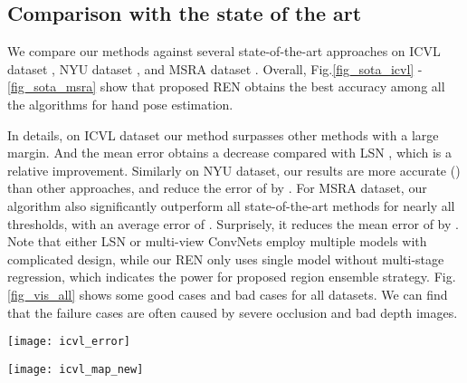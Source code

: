 \documentclass[10pt,twocolumn,letterpaper]{article}
\begin{document}
\subsection{Comparison with the state of the art}
We compare our methods against several state-of-the-art approaches on ICVL dataset \cite{tang2014latent} \cite{oberweger2015hands} \cite{sun2015cascaded} \cite{zhou2016model} \cite{wan2016hand} \cite{wan2017cross}, NYU dataset \cite{tompson2014real} \cite{oberweger2015hands} \cite{oberwegertraining} \cite{sinha2016deephand} \cite{gerobust} \cite{zhou2016model} \cite{zhang2016learning} \cite{wan2017cross}, and MSRA dataset \cite{sun2015cascaded} \cite{choi2015collaborative} \cite{gerobust} \cite{wan2016hand} \cite{wan2017cross}. Overall, Fig.\ref{fig_sota_icvl} - \ref{fig_sota_msra} show that proposed REN obtains the best accuracy among all the algorithms for hand pose estimation.

In details, on ICVL dataset our method surpasses other methods with a large margin. And the mean error  obtains a  decrease compared with LSN \cite{wan2016hand}, which is a  relative improvement. Similarly on NYU dataset, our results are more accurate () than other approaches, and reduce the error of \cite{zhang2016learning} by . For MSRA dataset, our algorithm also significantly outperform all state-of-the-art methods for nearly all thresholds, with an average error of . Surprisely, it reduces the mean error of \cite{gerobust} by . Note that either LSN or multi-view ConvNets \cite{gerobust} employ multiple models with complicated design, while our REN only uses single model without multi-stage regression, which indicates the power for proposed region ensemble strategy. Fig. \ref{fig_vis_all} shows some good cases and bad cases for all datasets. We can find that the failure cases are often caused by severe occlusion and bad depth images.

\begin{figure*}[htb]
\centering
\begin{minipage}[b]{0.49\textwidth}
  \centering
  \centerline{\texttt{[image: icvl\_error]}}
\end{minipage}
\begin{minipage}[b]{0.49\textwidth}
  \centering
  \centerline{\texttt{[image: icvl\_map\_new]}}
\end{minipage}
\caption{Comparison with state-of-the-arts on ICVL \cite{tang2014latent} dataset: distance error (left) and percentage of success frames (right).}
\label{fig_sota_icvl}
\end{figure*}
\end{document}

